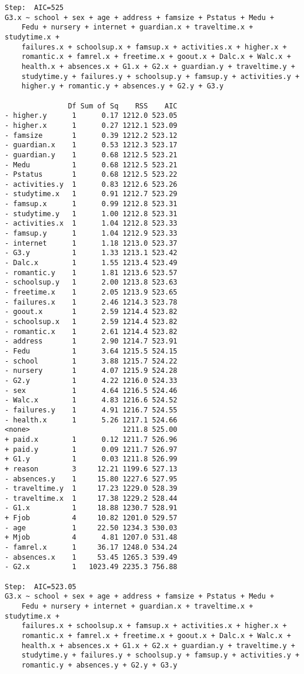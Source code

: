 \documentclass[11pt]{article}
\begin{document}
\begin{enumerate}
\begin{verbatim}
Step:  AIC=525
G3.x ~ school + sex + age + address + famsize + Pstatus + Medu + 
    Fedu + nursery + internet + guardian.x + traveltime.x + studytime.x + 
    failures.x + schoolsup.x + famsup.x + activities.x + higher.x + 
    romantic.x + famrel.x + freetime.x + goout.x + Dalc.x + Walc.x + 
    health.x + absences.x + G1.x + G2.x + guardian.y + traveltime.y + 
    studytime.y + failures.y + schoolsup.y + famsup.y + activities.y + 
    higher.y + romantic.y + absences.y + G2.y + G3.y

               Df Sum of Sq    RSS    AIC
- higher.y      1      0.17 1212.0 523.05
- higher.x      1      0.27 1212.1 523.09
- famsize       1      0.39 1212.2 523.12
- guardian.x    1      0.53 1212.3 523.17
- guardian.y    1      0.68 1212.5 523.21
- Medu          1      0.68 1212.5 523.21
- Pstatus       1      0.68 1212.5 523.22
- activities.y  1      0.83 1212.6 523.26
- studytime.x   1      0.91 1212.7 523.29
- famsup.x      1      0.99 1212.8 523.31
- studytime.y   1      1.00 1212.8 523.31
- activities.x  1      1.04 1212.8 523.33
- famsup.y      1      1.04 1212.9 523.33
- internet      1      1.18 1213.0 523.37
- G3.y          1      1.33 1213.1 523.42
- Dalc.x        1      1.55 1213.4 523.49
- romantic.y    1      1.81 1213.6 523.57
- schoolsup.y   1      2.00 1213.8 523.63
- freetime.x    1      2.05 1213.9 523.65
- failures.x    1      2.46 1214.3 523.78
- goout.x       1      2.59 1214.4 523.82
- schoolsup.x   1      2.59 1214.4 523.82
- romantic.x    1      2.61 1214.4 523.82
- address       1      2.90 1214.7 523.91
- Fedu          1      3.64 1215.5 524.15
- school        1      3.88 1215.7 524.22
- nursery       1      4.07 1215.9 524.28
- G2.y          1      4.22 1216.0 524.33
- sex           1      4.64 1216.5 524.46
- Walc.x        1      4.83 1216.6 524.52
- failures.y    1      4.91 1216.7 524.55
- health.x      1      5.26 1217.1 524.66
<none>                      1211.8 525.00
+ paid.x        1      0.12 1211.7 526.96
+ paid.y        1      0.09 1211.7 526.97
+ G1.y          1      0.03 1211.8 526.99
+ reason        3     12.21 1199.6 527.13
- absences.y    1     15.80 1227.6 527.95
- traveltime.y  1     17.23 1229.0 528.39
- traveltime.x  1     17.38 1229.2 528.44
- G1.x          1     18.88 1230.7 528.91
+ Fjob          4     10.82 1201.0 529.57
- age           1     22.50 1234.3 530.03
+ Mjob          4      4.81 1207.0 531.48
- famrel.x      1     36.17 1248.0 534.24
- absences.x    1     53.45 1265.3 539.49
- G2.x          1   1023.49 2235.3 756.88

Step:  AIC=523.05
G3.x ~ school + sex + age + address + famsize + Pstatus + Medu + 
    Fedu + nursery + internet + guardian.x + traveltime.x + studytime.x + 
    failures.x + schoolsup.x + famsup.x + activities.x + higher.x + 
    romantic.x + famrel.x + freetime.x + goout.x + Dalc.x + Walc.x + 
    health.x + absences.x + G1.x + G2.x + guardian.y + traveltime.y + 
    studytime.y + failures.y + schoolsup.y + famsup.y + activities.y + 
    romantic.y + absences.y + G2.y + G3.y


\end{verbatim}
\end{enumerate}
\end{document}
